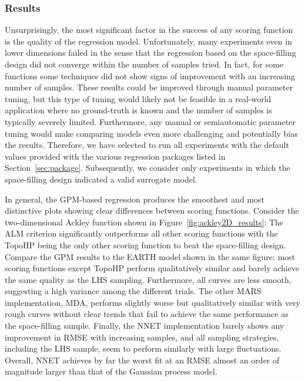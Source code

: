 \subsubsection{Results} Unsurprisingly, the most significant factor in the success of any scoring function is the quality of the regression model.
%
Unfortunately, many experiments even in lower dimensions failed in the sense that the regression based on the space-filling design did not converge within the number of samples tried.
%
In fact, for some functions some techniques did not show signs of improvement with an increasing number of samples.
%
These results could be improved through manual parameter tuning, but this type of tuning would likely not be feasible in a real-world application where no ground-truth is known and the number of samples is typically severely limited.
%
Furthermore, any manual or semiautomatic parameter tuning would make comparing models even more challenging and potentially bias the results.
%
Therefore, we have selected to run all experiments with the default values provided with the various regression packages listed in Section~\ref{sec:package}.
%
Subsequently, we consider only experiments in which the space-filling design indicated a valid surrogate model.

In general, the GPM-based regression produces the smoothest and most distinctive plots showing clear differences between scoring functions.
%
Consider the two-dimensional Ackley function shown in Figure~\ref{fig:ackley2D_results}: The ALM criterion significantly outperforms all other scoring functions with the TopoHP being the only other scoring function to beat the space-filling design.
%
Compare the GPM results to the EARTH model shown in the same figure: most scoring functions except TopoHP perform qualitatively similar and barely achieve the same quality as the LHS sampling.
%
Furthermore, all curves are less smooth, suggesting a high variance among the different trials.
%
The other MARS implementation, MDA, performs slightly worse but qualitatively similar with very rough curves without clear trends that fail to achieve the same performance as the space-filling sample.
%
Finally, the NNET implementation barely shows any improvement in RMSE with increasing samples, and all sampling strategies, including the LHS sample, seem to perform similarly with large fluctuations.
%
Overall, NNET achieves by far the worst fit at an RMSE almost an order of magnitude larger than that of the Gaussian process model.

